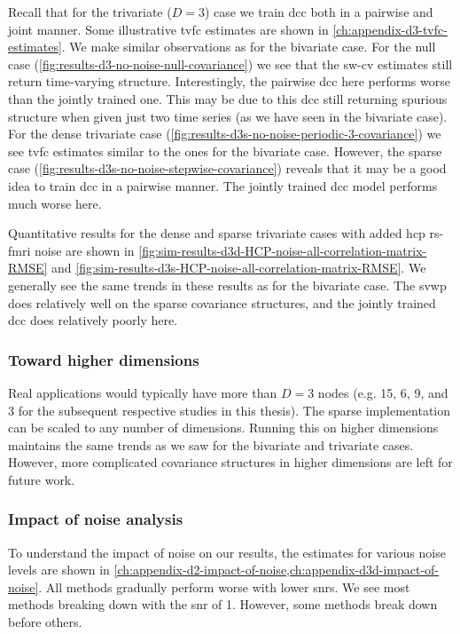 Recall that for the trivariate ($D = 3$) case we train \gls{dcc} both in a pairwise and joint manner.
Some illustrative \gls{tvfc} estimates are shown in \cref{ch:appendix-d3-tvfc-estimates}.
We make similar observations as for the bivariate case.
For the null case (\cref{fig:results-d3-no-noise-null-covariance}) we see that the \gls{sw-cv} estimates still return time-varying structure.
Interestingly, the pairwise \gls{dcc} here performs worse than the jointly trained one.
This may be due to this \gls{dcc} still returning spurious structure when given just two time series (as we have seen in the bivariate case).
For the dense trivariate case (\cref{fig:results-d3s-no-noise-periodic-3-covariance}) we see \gls{tvfc} estimates similar to the ones for the bivariate case.
However, the sparse case (\cref{fig:results-d3s-no-noise-stepwise-covariance}) reveals that it may be a good idea to train \gls{dcc} in a pairwise manner.
The jointly trained \gls{dcc} model performs much worse here.

Quantitative results for the dense and sparse trivariate cases with added \gls{hcp} \gls{rs-fmri} noise are shown in \cref{fig:sim-results-d3d-HCP-noise-all-correlation-matrix-RMSE} and \cref{fig:sim-results-d3s-HCP-noise-all-correlation-matrix-RMSE}.
We generally see the same trends in these results as for the bivariate case.
The \gls{svwp} does relatively well on the sparse covariance structures, and the jointly trained \gls{dcc} does relatively poorly here.

\subsubsection{Toward higher dimensions}

Real applications would typically have more than $D = 3$ nodes (e.g. 15, 6, 9, and 3 for the subsequent respective studies in this thesis).
The sparse implementation can be scaled to any number of dimensions.
Running this on higher dimensions maintains the same trends as we saw for the bivariate and trivariate cases.
However, more complicated covariance structures in higher dimensions are left for future work.

\subsubsection{Impact of noise analysis}\label{subsec:impact-of-noise-analysis}

To understand the impact of noise on our results, the estimates for various noise levels are shown in \cref{ch:appendix-d2-impact-of-noise,ch:appendix-d3d-impact-of-noise}.
All methods gradually perform worse with lower \glspl{snr}.
We see most methods breaking down with the \gls{snr} of 1.
However, some methods break down before others.

